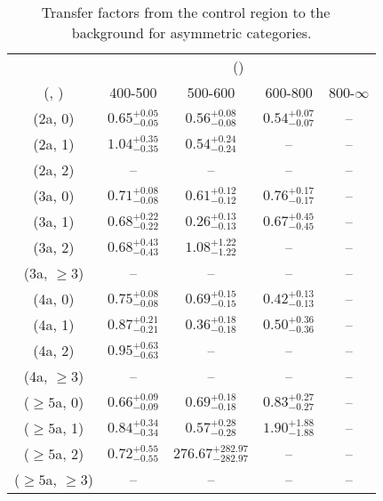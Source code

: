 \begin{table}[h!]
\tiny
\centering
\caption{Transfer factors from the \gj control region to the \zInv~ background for asymmetric categories.\label{tab:tf_gj_zinv_asym}}
\begin{tabular}
{ccccc}
	\hline\hline
	& \multicolumn{4}{c}{\scalht (\gev)} \\ 
	 (\njet,  \nb) & 400-500 & 500-600 & 600-800 & 800-$\infty$ \\ [0.8ex] 
\hline
	(2a, 0) & $0.65^{+ 0.05 }_{- 0.05 }$ & $0.56^{+ 0.08 }_{- 0.08 }$ & $0.54^{+ 0.07 }_{- 0.07 }$ & -- \\[0.5ex] 
	(2a, 1) & $1.04^{+ 0.35 }_{- 0.35 }$ & $0.54^{+ 0.24 }_{- 0.24 }$ & -- & -- \\[0.5ex] 
	(2a, 2) & -- & -- & -- & -- \\[0.5ex] 
	(3a, 0) & $0.71^{+ 0.08 }_{- 0.08 }$ & $0.61^{+ 0.12 }_{- 0.12 }$ & $0.76^{+ 0.17 }_{- 0.17 }$ & -- \\[0.5ex] 
	(3a, 1) & $0.68^{+ 0.22 }_{- 0.22 }$ & $0.26^{+ 0.13 }_{- 0.13 }$ & $0.67^{+ 0.45 }_{- 0.45 }$ & -- \\[0.5ex] 
	(3a, 2) & $0.68^{+ 0.43 }_{- 0.43 }$ & $1.08^{+ 1.22 }_{- 1.22 }$ & -- & -- \\[0.5ex] 
	(3a, $\ge3$) & -- & -- & -- & -- \\[0.5ex] 
	(4a, 0) & $0.75^{+ 0.08 }_{- 0.08 }$ & $0.69^{+ 0.15 }_{- 0.15 }$ & $0.42^{+ 0.13 }_{- 0.13 }$ & -- \\[0.5ex] 
	(4a, 1) & $0.87^{+ 0.21 }_{- 0.21 }$ & $0.36^{+ 0.18 }_{- 0.18 }$ & $0.50^{+ 0.36 }_{- 0.36 }$ & -- \\[0.5ex] 
	(4a, 2) & $0.95^{+ 0.63 }_{- 0.63 }$ & -- & -- & -- \\[0.5ex] 
	(4a, $\ge3$) & -- & -- & -- & -- \\[0.5ex] 
	($\ge5$a, 0) & $0.66^{+ 0.09 }_{- 0.09 }$ & $0.69^{+ 0.18 }_{- 0.18 }$ & $0.83^{+ 0.27 }_{- 0.27 }$ & -- \\[0.5ex] 
	($\ge5$a, 1) & $0.84^{+ 0.34 }_{- 0.34 }$ & $0.57^{+ 0.28 }_{- 0.28 }$ & $1.90^{+ 1.88 }_{- 1.88 }$ & -- \\[0.5ex] 
	($\ge5$a, 2) & $0.72^{+ 0.55 }_{- 0.55 }$ & $276.67^{+ 282.97 }_{- 282.97 }$ & -- & -- \\[0.5ex] 
	($\ge5$a, $\ge3$) & -- & -- & -- & -- \\[0.5ex] 
	\hline
	\hline
\end{tabular}
\end{table}
